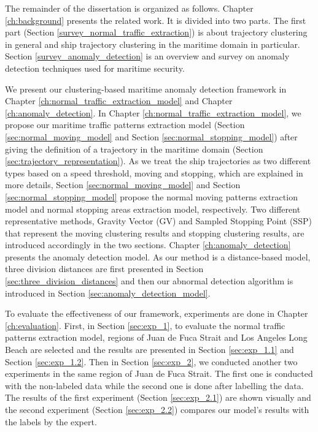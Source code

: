 \documentclass[12pt,glossary]{dalcsthesis}
\begin{document}
The remainder of the dissertation is organized as follows. %
Chapter \ref{ch:background} presents the related work. It is divided into two parts. %
The first part (Section \ref{survey_normal_traffic_extraction}) is about trajectory clustering in general and ship trajectory clustering in the maritime domain in particular.  Section \ref{survey_anomaly_detection} is an overview and survey on anomaly detection techniques used for maritime security.

We present our clustering-based maritime anomaly detection framework in Chapter \ref{ch:normal_traffic_extraction_model} and Chapter \ref{ch:anomaly_detection}. In Chapter \ref{ch:normal_traffic_extraction_model}, we propose our maritime traffic patterns extraction model (Section \ref{sec:normal_moving_model} and Section \ref{sec:normal_stopping_model}) after giving the definition of a trajectory in the maritime domain (Section \ref{sec:trajectory_representation}). As we treat the ship trajectories as two different types based on a speed threshold, moving and stopping, which are explained in more details, Section \ref{sec:normal_moving_model} and Section \ref{sec:normal_stopping_model} propose the normal moving patterns extraction model and normal stopping areas extraction model, respectively. Two different representative  methods, Gravity Vector (GV) and Sampled Stopping Point (SSP) that represent the moving clustering results and stopping clustering results, are introduced accordingly in the two sections. Chapter \ref{ch:anomaly_detection} presents the  anomaly detection model. As our method is a distance-based model, three division distances are first presented in Section \ref{sec:three_division_distances} and then our abnormal detection algorithm is introduced in Section \ref{sec:anomaly_detection_model}.

To evaluate the effectiveness of our framework,  experiments are done in Chapter \ref{ch:evaluation}. First, in Section \ref{sec:exp_1},  to evaluate the normal traffic patterns extraction model, regions of Juan de Fuca Strait and Los Angeles Long Beach are selected and the results are presented in Section \ref{sec:exp_1.1} and Section \ref{sec:exp_1.2}. Then in Section \ref{sec:exp_2}, we conducted another two experiments in the same region of Juan de Fuca Strait. The first one is conducted with the non-labeled data while the second one is done after labelling the data. The results of the first experiment (Section \ref{sec:exp_2.1}) are shown  visually  and  the  second  experiment (Section \ref{sec:exp_2.2}) compares our model's results with the labels by the expert. 
\end{document}
